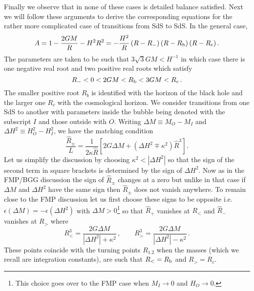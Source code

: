 \documentclass[a4paper,11pt]{article}
\numberwithin{equation}{section}
\numberwithin{equation}{section}
\begin{document}
Finally we observe that in none of these cases is detailed balance
satisfied. Next we will follow these arguments to derive the corresponding equations for the rather more complicated case of transitions from SdS to SdS. In the general case,
\begin{equation}
A=1-\frac{2GM}{R}-H^{2}R^{2}=-\frac{H^{2}}{R}\left(R-R_{-}\right)\left(R-R_{{\rm b}}\right)\left(R-R_{c}\right).\label{eq:SdS-A}
\end{equation}
The parameters are taken to be such that $3\sqrt{3}GM<H^{-1}$ in
which case there is one negative real root and two positive real roots
which satisfy
\begin{equation}
R_{-}<0<2GM<R_{{\rm b}}<3GM<R_{c} \,.\label{eq:SdS-roots}
\end{equation}
The smaller positive root $R_{b}$ is identified with the horizon of the black hole and the larger one $R_{c}$ with the cosmological
 horizon. We consider transitions from one SdS to another with
parameters inside the bubble being denoted with the subscript $I$
and those outside with $O$. Writing $\Delta M\equiv M_{O}-M_{I}$
and $\Delta H^{2}\equiv H_{O}^{2}-H_{I}^{2}$, we have the matching
condition
\begin{equation}
\frac{\hat{R}_{\pm}}{L}=\frac{1}{2\kappa\hat{R}}\left[2G\Delta M+\left(\Delta H^{2}\mp\kappa^{2}\right)\hat{R}^{3}\right].\label{eq:SdS-match}
\end{equation}
Let us simplify the discussion by choosing $\kappa^{2}<|\Delta H^{2}|$
so that the sign of the second term in square brackets is determined
by the sign of $\Delta H^{2}$. Now as in the FMP/BGG discussion the
sign of $\hat{R}_{\pm}$ changes at a zero but unlike in that case
if $\Delta M$ and $\Delta H^{2}$ have the same sign then $\hat{R}_{\pm}$
does not vanish anywhere. To remain close to the FMP discussion let
us first choose these signs to be opposite i.e. $\epsilon(\Delta M)=-\epsilon(\Delta H^{2})$
with $\Delta M>0$\footnote{This choice goes over to the FMP case when $M_{I}\rightarrow0$ and $H_{O}\rightarrow0$.} so that $\hat{R}_{+}$ vanishes at $R_{<}$ and $\hat{R}_{-}$ vanishes at $R_{>}$ where 
\begin{equation}
R_{<}^{3}=\frac{2G\Delta M}{|\Delta H^{2}|+\kappa^{2}} \,,\qquad R_{>}^{3}=\frac{2G\Delta M}{|\Delta H^{2}|-\kappa^{2}} \,.\label{eq:R<>}
\end{equation}
These points coincide with the turning points $R_{1.2}$ when the
masses (which we recall are integration constants), are such that
$R_{<}=R_{{\rm b}}$ and $R_{>}=R_{c}$.
\end{document}
